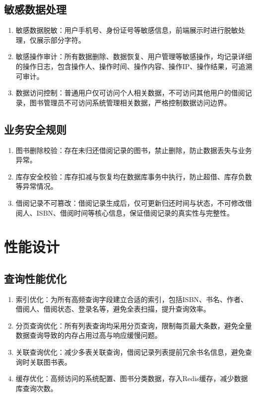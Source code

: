 \documentclass[12pt, a4paper]{article}
\begin{document}
\subsection{敏感数据处理}

\begin{enumerate}
\item  敏感数据脱敏：用户手机号、身份证号等敏感信息，前端展示时进行脱敏处理，仅展示部分字符。

\item  敏感操作审计：所有数据删除、数据恢复、用户管理等敏感操作，均记录详细的操作日志，包含操作人、操作时间、操作内容、操作IP、操作结果，可追溯可审计。

\item  数据访问控制：普通用户仅可访问个人相关数据，不可访问其他用户的借阅记录，图书管理员不可访问系统管理相关数据，严格控制数据访问边界。
\end{enumerate}

\subsection{业务安全规则}

\begin{enumerate}
\item  图书删除校验：存在未归还借阅记录的图书，禁止删除，防止数据丢失与业务异常。

\item  库存安全校验：库存扣减与恢复均在数据库事务中执行，防止超借、库存负数等异常情况。

\item  借阅记录不可篡改：借阅记录生成后，仅可更新归还时间与状态，不可修改借阅人、ISBN、借阅时间等核心信息，保证借阅记录的真实性与完整性。
\end{enumerate}

\newpage
\section{性能设计}

\subsection{查询性能优化}

\begin{enumerate}
\item  索引优化：为所有高频查询字段建立合适的索引，包括ISBN、书名、作者、借阅人、借阅状态、登录名等，避免全表扫描，提升查询效率。

\item  分页查询优化：所有列表查询均采用分页查询，限制每页最大条数，避免全量数据查询导致的内存占用过高与响应缓慢问题。

\item  关联查询优化：减少多表关联查询，借阅记录列表提前冗余书名信息，避免查询时关联图书表。

\item  缓存优化：高频访问的系统配置、图书分类数据，存入Redis缓存，减少数据库查询次数。
\end{enumerate}
\end{document}
